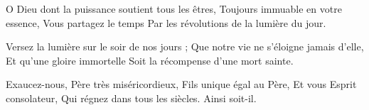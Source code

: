 O Dieu dont la puissance soutient tous les êtres,
Toujours immuable en votre essence,
Vous partagez le temps
Par les révolutions de la lumière du jour.

Versez la lumière sur le soir de nos jours ;
Que notre vie ne s'éloigne jamais d'elle,
Et qu'une gloire immortelle
Soit la récompense d'une mort sainte.

Exaucez-nous, Père très miséricordieux,
Fils unique égal au Père,
Et vous Esprit consolateur,
Qui régnez dans tous les siècles.
Ainsi soit-il.